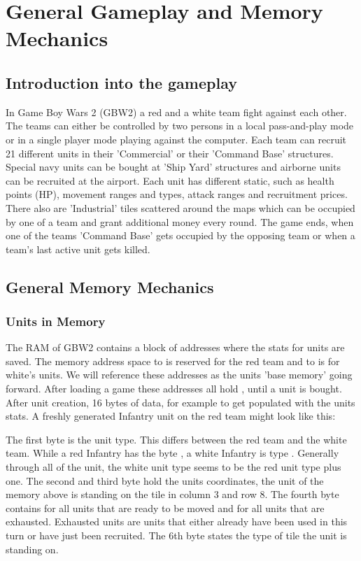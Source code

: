 \section{General Gameplay and Memory Mechanics}

\subsection{Introduction into the gameplay}
In Game Boy Wars 2 (GBW2) a red and a white team fight against each other. The teams can either be controlled by two persons in a local pass-and-play mode or in a single player mode playing against the computer.
Each team can recruit 21 different units in their 'Commercial' or their 'Command Base' structures.
Special navy units can be bought at 'Ship Yard' structures and airborne units can be recruited at the airport.
Each unit has different static, such as health points (HP), movement ranges and types, attack ranges and recruitment prices.
There also are 'Industrial' tiles scattered around the maps which can be occupied by one of a team and grant additional money every round.
The game ends, when one of the teams 'Command Base' gets occupied by the opposing team or when a team's last active unit gets killed.

\subsection{General Memory Mechanics}
\subsubsection{Units in Memory}
The RAM of GBW2 contains a block of addresses where the stats for units are saved. The memory address space  to  is reserved for the red team and  to  is for white's units. We will reference these addresses as the units 'base memory' going forward.
After loading a game these addresses all hold , until a unit is bought.
After unit creation, 16 bytes of data, for example  to  get populated with the units stats.
A freshly generated Infantry unit on the red team might look like this:


The first byte is the unit type. This differs between the red team and the white team. While a red Infantry has the byte , a white Infantry is type . Generally through all of the unit, the white unit type seems to be the red unit type plus one.
The second and third byte hold the units coordinates, the unit of the memory above is standing on the tile in column 3 and row 8. The fourth byte contains  for all units that are ready to be moved and  for all units that are exhausted. Exhausted units are units that either already have been used in this turn or have just been recruited.
The 6th byte states the type of tile the unit is standing on.

